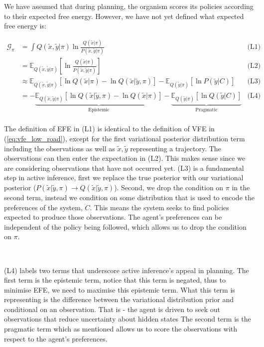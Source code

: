 \documentclass{article}
\newcommand{\refp}[1]{(\ref{#1})}
\begin{document}
We have assumed that during planning, the organism scores its policies according to their expected free energy. However, we have not yet defined what expected free energy is:

\begin{equation}\label{eq:efe}
	\begin{aligned}
		\mathcal{G}_\pi &= \int Q(\tilde{x}, \tilde{y} | \pi) \ln \frac{Q(\tilde{x} | \pi)}{P(\tilde{x}, \tilde{y} | \pi)} & \text{(L1)}\\ 
		&= \mathbb{E}_{Q(\tilde{x}, \tilde{y} | \pi)} \left[ \ln \frac{Q(\tilde{x} | \pi)}{P(\tilde{x}, \tilde{y} | \pi)} \right] & \text{(L2)} \\
		&\approx \mathbb{E}_{Q(\tilde{x}, \tilde{y} | \pi)} \left[ \ln Q(\tilde{x} | \pi) - \ln Q(\tilde{x} | \tilde{y}, \pi) \right] - \mathbb{E}_{Q(\tilde{y} | \pi)}\left[ \ln P(\tilde{y} | C) \right] & \text{(L3)}\\
		&= - \underbrace{\mathbb{E}_{Q(\tilde{x}, \tilde{y} | \pi)} \left[ \ln Q(\tilde{x} | \tilde{y}, \pi) - \ln Q(\tilde{x} | \pi) \right]}_{\text{Epistemic}} - \underbrace{\mathbb{E}_{Q(\tilde{y} | \pi)}\left[ \ln Q(\tilde{y} | C) \right]}_{\text{Pragmatic}} & \text{(L4)}\\ 
	\end{aligned}
\end{equation}


The definition of EFE in (L1) is identical to the definition of VFE in \refp{eq:vfe_low_road}, except for the first variational posterior distribution term including the observations as well as $\tilde{x}, \tilde{y}$ representing a trajectory. The observations can then enter the expectation in (L2). This makes sense since we are considering observations that have not occurred yet. (L3) is a fundamental step in active inference, first we replace the true posterior with our variational posterior ($P(\tilde{x} | \tilde{y}, \pi) \to Q(\tilde{x} | \tilde{y}, \pi)$). Second, we drop the condition on $\pi$ in the second term, instead we condition on some distribution that is used to encode the preferences of the system, $C$. This means the system seeks to find policies expected to produce those observations. The agent’s preferences can be independent of the policy being followed, which allows us to drop the condition on $\pi$. 

\

(L4) labels two terms that underscore active inference's appeal in planning. The first term is the epistemic term, notice that this term is negated, thus to minimise EFE, we need to maximise this epistemic term. What this term is representing is the difference between the variational distribution prior and conditional on an observation. That is - the agent is driven to seek out observations that reduce uncertainty about hidden states \citep{smith2022} The second term is the pragmatic term which as mentioned allows us to score the observations with respect to the agent's preferences. 
\end{document}
